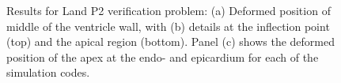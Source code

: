 \begin{figure}[ht!]
{\label{fig:land2-2}}	
%
\caption{Results for Land P2 verification problem: (a) Deformed position of middle of the ventricle wall, with (b) details at the inflection point (top) and the apical region (bottom). Panel (c) shows the deformed position of the apex at the endo- and epicardium for each of the simulation codes.}
\label{fig:land2}
\end{figure}

